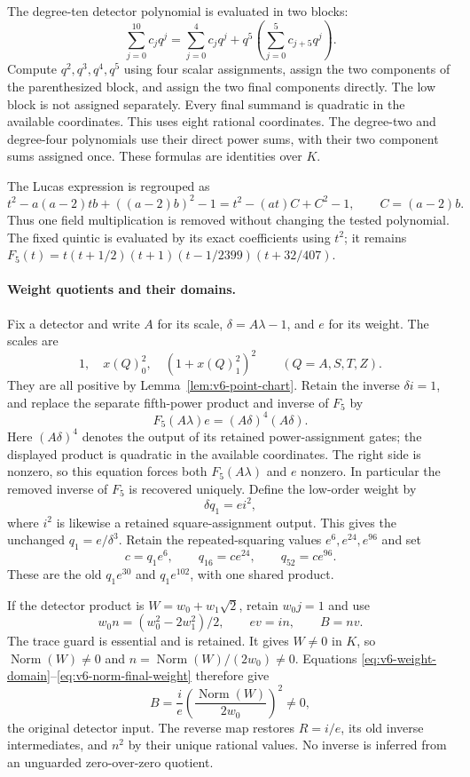\documentclass[11pt]{article}
\theoremstyle{definition}
\theoremstyle{remark}
\begin{document}
The degree-ten detector polynomial is evaluated in two blocks:
\begin{equation}\label{eq:v6-detector-block-evaluation}
 \sum_{j=0}^{10}c_jq^j
 =\sum_{j=0}^{4}c_jq^j
   +q^5\left(\sum_{j=0}^{5}c_{j+5}q^j\right).
\end{equation}
Compute $q^2,q^3,q^4,q^5$ using four scalar assignments, assign the
two components of the parenthesized block, and assign the two final
components directly. The low block is not assigned separately.
Every final summand is quadratic in the available coordinates. This
uses eight rational coordinates. The degree-two and degree-four
polynomials use their direct power sums, with their two component
sums assigned once. These formulas are identities over $K$.

The Lucas expression is regrouped as
\[
 t^2-a(a-2)tb+((a-2)b)^2-1
 =t^2-(at)C+C^2-1,\qquad C=(a-2)b.
\]
Thus one field multiplication is removed without changing the tested
polynomial. The fixed quintic is evaluated by its exact coefficients
using $t^2$; it remains
$F_5(t)=t(t+1/2)(t+1)(t-1/2399)(t+32/407)$.

\paragraph{Weight quotients and their domains.}
Fix a detector and write $A$ for its scale, $\delta=A\lambda-1$,
and $e$ for its weight. The scales are
\[
 1,\quad x(Q)_0^2,\quad (1+x(Q)_1^2)^2
 \qquad(Q=A,S,T,Z).
\]
They are all positive by Lemma~\ref{lem:v6-point-chart}. Retain the
inverse $\delta i=1$, and replace the separate fifth-power product
and inverse of $F_5$ by
\begin{equation}\label{eq:v6-weight-domain}
 F_5(A\lambda)e=(A\delta)^4(A\delta).
\end{equation}
Here $(A\delta)^4$ denotes the output of its retained power-assignment
gates; the displayed product is quadratic in the available coordinates.
The right side is nonzero, so this equation forces both $F_5(A\lambda)$
and $e$ nonzero. In particular the removed inverse of $F_5$ is recovered
uniquely. Define the low-order weight by
\[
 \delta q_1=e i^2,
\]
where $i^2$ is likewise a retained square-assignment output. This gives
the unchanged $q_1=e/\delta^3$. Retain the repeated-squaring
values $e^6,e^{24},e^{96}$ and set
\[
 c=q_1e^6,\qquad q_{16}=ce^{24},\qquad q_{52}=ce^{96}.
\]
These are the old $q_1e^{30}$ and $q_1e^{102}$, with one shared product.

If the detector product is $W=w_0+w_1\sqrt2$, retain $w_0j=1$ and use
\begin{equation}\label{eq:v6-norm-final-weight}
 w_0n=(w_0^2-2w_1^2)/2,\qquad ev=in,\qquad B=nv.
\end{equation}
The trace guard is essential and is retained. It gives $W\ne0$ in $K$,
so $\operatorname{Norm}(W)\ne0$ and
$n=\operatorname{Norm}(W)/(2w_0)\ne0$. Equations
\eqref{eq:v6-weight-domain}--\eqref{eq:v6-norm-final-weight} therefore
give
\[
 B=\frac{i}{e}\left(\frac{\operatorname{Norm}(W)}{2w_0}\right)^2\ne0,
\]
the original detector input. The reverse map restores $R=i/e$, its
old inverse intermediates, and $n^2$ by their unique rational values.
No inverse is inferred from an unguarded zero-over-zero quotient.
\end{document}

